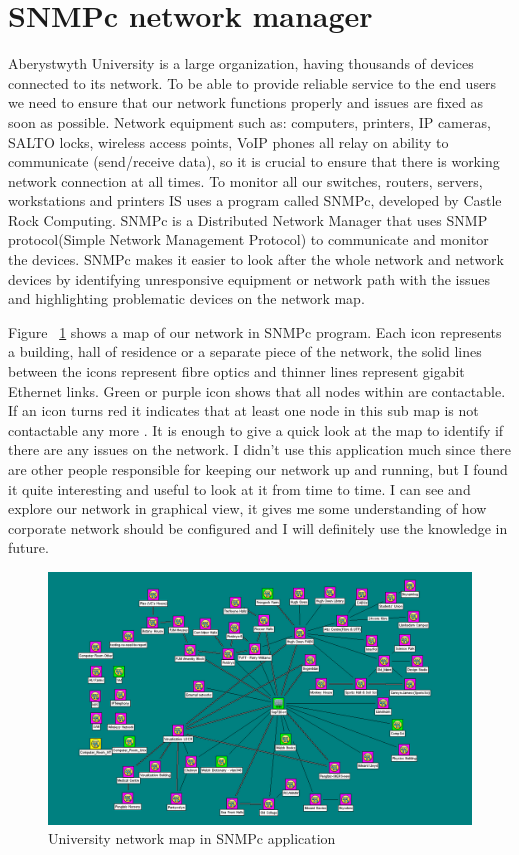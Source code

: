 \documentclass[10pt,a4paper,headinclude=true,twoside]{report}
\begin{document}
\section{SNMPc network manager}
Aberystwyth University is a large organization, having thousands of devices connected to its network. To be able to provide reliable service to the end users we need to ensure that our network functions properly and issues are fixed as soon as possible. Network equipment such as: computers, printers, IP cameras, SALTO locks, wireless access points, VoIP phones all relay on ability to communicate (send/receive data), so it is crucial to ensure that there is working network connection at all times.  To monitor all our switches, routers, servers, workstations and printers IS uses a program called SNMPc, developed by Castle Rock Computing. SNMPc is a Distributed Network Manager \cite{SNMPc} that uses SNMP protocol(Simple Network Management Protocol) to communicate and monitor the devices. SNMPc makes it easier to look after the whole network and network devices by identifying unresponsive equipment or network path with the issues and highlighting problematic devices on the network map. 

Figure ~\ref{fig:SNMPc_main} shows a map of our network in SNMPc program. Each icon represents a building, hall of residence or a separate piece of the network, the solid lines between the icons represent fibre optics and thinner lines represent gigabit Ethernet links. Green or purple icon shows that all nodes within are contactable. If an icon turns red it indicates that at least one node in this sub map is not contactable any more \cite{SNPMcSharePoint}. It is enough to give a quick look at the map to identify if there are any issues on the network. I didn't use this application much since there are other people responsible for keeping our network up and running, but I found it quite interesting and useful to look at it from time to time. I can see and explore our network in graphical view, it gives me some understanding of how corporate network should be configured and I will definitely use the knowledge in future.

\begin{figure}[H]
\centering
\centerline{\includegraphics[scale=0.5]{./SNMPc_main}}
\caption{University network map in SNMPc application}
\label{fig:SNMPc_main}
\end{figure}
\end{document}
